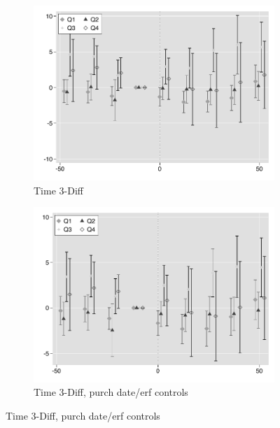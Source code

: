 \documentclass[12pt]{article}
\begin{document}
\begin{figure}
 \begin{subfigure}[b]{0.48\textwidth}
                    \caption[Network2]%
            {{\footnotesize Time 3-Diff}}    
            \label{fig:prefor}
            \centering
            \includegraphics[width=\textwidth,trim={0.3cm .3cm 0.1cm 0cm}, clip=true]{figures/freq_time_3d_no_ctrl_q}
        \end{subfigure}
        \hfill
        \begin{subfigure}[b]{0.48\textwidth}
                    \caption[Network2]%
            {{\footnotesize Time 3-Diff, purch date/erf controls}}    
            \label{fig:prefor}
            \centering
            \includegraphics[width=\textwidth,trim={0.3cm .3cm 0.1cm 0cm}, clip=true]{figures/freq_time_3d_ctrl_q}

\end{subfigure}
\end{figure}
\end{document}
